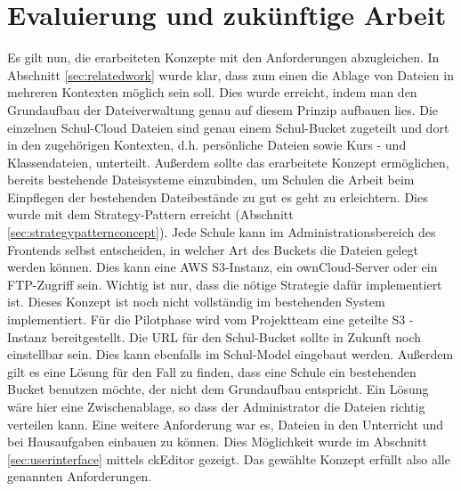 \section{Evaluierung und zukünftige Arbeit}
\label{sec:evaluation}


Es gilt nun, die erarbeiteten Konzepte mit den Anforderungen abzugleichen. In Abschnitt \ref{sec:relatedwork} wurde klar, dass zum einen die Ablage von Dateien in mehreren Kontexten möglich sein soll. Dies wurde erreicht, indem man den Grundaufbau der Dateiverwaltung genau auf diesem Prinzip aufbauen lies. Die einzelnen Schul-Cloud Dateien sind genau einem Schul-Bucket zugeteilt und dort in den zugehörigen Kontexten, d.h. persönliche Dateien sowie Kurs - und Klassendateien, unterteilt. Außerdem sollte das erarbeitete Konzept ermöglichen, bereits bestehende Dateisysteme einzubinden, um Schulen die Arbeit beim Einpflegen der bestehenden Dateibestände zu gut es geht zu erleichtern. Dies wurde mit dem Strategy-Pattern erreicht (Abschnitt \ref{sec:strategypatternconcept}). Jede Schule kann im Administrationsbereich des Frontends selbst entscheiden, in welcher Art des Buckets die Dateien gelegt werden können. Dies kann eine AWS S3-Instanz, ein ownCloud-Server oder ein FTP-Zugriff sein. Wichtig ist nur, dass die nötige Strategie dafür implementiert ist. Dieses Konzept ist noch nicht vollständig im bestehenden System implementiert. Für die Pilotphase wird vom Projektteam eine geteilte S3 - Instanz bereitgestellt. Die URL für den Schul-Bucket sollte in Zukunft noch einstellbar sein. Dies kann ebenfalls im Schul-Model eingebaut werden. Außerdem gilt es eine Lösung für den Fall zu finden, dass eine Schule ein bestehenden Bucket benutzen möchte, der nicht dem Grundaufbau entspricht. Ein Lösung wäre hier eine Zwischenablage, so dass der Administrator die Dateien richtig verteilen kann. Eine weitere Anforderung war es, Dateien in den Unterricht und bei Hausaufgaben einbauen zu können. Dies Möglichkeit wurde im Abschnitt \ref{sec:userinterface} mittels ckEditor gezeigt. Das gewählte Konzept erfüllt also alle genannten Anforderungen.

